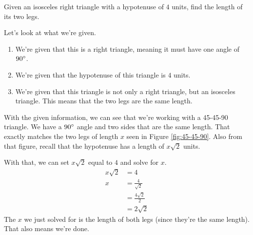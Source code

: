 \begin{solution}
\begin{center}
    \end{center}
\end{solution}
\begin{problem}
    Given an isosceles right triangle with a hypotenuse of $4$ units, find the length of its two legs.
\end{problem}
\begin{solution}
    Let's look at what we're given.
    \begin{enumerate}
        \item We're given that this is a right triangle, meaning it must have one angle of $90\degree$.
        \item We're given that the hypotenuse of this triangle is $4$ units.
        \item We're given that this triangle is not only a right triangle, but an isosceles triangle. This means that the two legs are the same length.
    \end{enumerate}
    \clearpage
    With the given information, we can see that we're working with a 45-45-90 triangle. We have a $90\degree$ angle and two sides that are the same length. That exactly matches the two legs of length $x$ seen in Figure \ref{fig:45-45-90}. Also from that figure, recall that the hypotenuse has a length of $x\sqrt{2}$ units.

    With that, we can set $x\sqrt{2}$ equal to $4$ and solve for $x$.
    \begin{align*}
        x\sqrt{2} &= 4 \\
        x &= \frac{4}{\sqrt{2}} \\
        &= \frac{4\sqrt{2}}{2} \\
        &= 2\sqrt{2}
    \end{align*}
    The $x$ we just solved for is the length of both legs (since they're the same length). That also means we're done.
    \begin{center}
\end{center}
\end{solution}
